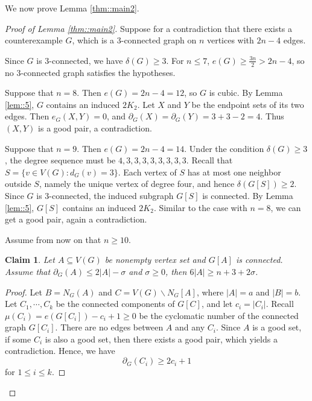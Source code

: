 \documentclass[11pt]{article}
\newtheorem{claim}{Claim}
\theoremstyle{definition}
\begin{document}
We now prove Lemma \ref{thm::main2}.





\begin{proof}[Proof of Lemma \ref{thm::main2}]
  Suppose for a contradiction that there exists a counterexample $G$, which is a $3$-connected graph on $n$ vertices with $2n-4$ edges.




  Since $G$ is $3$-connected, we have $\delta(G)\ge3$. For $n\leq7$, $e(G)\ge\frac{3n}{2}>2n-4$, so no $3$-connected graph satisfies the hypotheses.

  Suppose that $n=8$. Then $e(G)=2n-4=12$, so $G$ is cubic. By Lemma \ref{lem::5}, $G$ contains an induced $2K_2$. Let $X$ and $Y$ be the endpoint sets of its two edges. Then $e_G(X,Y)=0$, and
  $\partial_G(X)=\partial_G(Y)=3+3-2=4$.
  Thus $(X,Y)$ is a good pair, a contradiction.

  Suppose that $n=9$. Then $e(G)=2n-4=14$. Under the condition $\delta(G)\ge3$, the degree sequence must be $4,3,3,3,3,3,3,3,3$. Recall that $S=\{v\in V(G):d_G(v)=3\}$. Each vertex of $S$ has at most one neighbor outside $S$, namely the unique vertex of degree four, and hence $\delta(G[S])\ge2$. Since $G$ is 3-connected, the induced subgraph $G[S]$ is connected. By Lemma \ref{lem::5}, $G[S]$ contains an induced $2K_2$. Similar to the case with $n=8$, we can get a good pair, again a contradiction.

  Assume from now on that $n\geq 10$.

  \begin{claim}\label{claim::1}
    Let $A\subseteq V(G)$ be nonempty vertex set and $G[A]$ is connected. Assume that $\partial_G(A)\leq2|A|-\sigma$ and $\sigma\geq0$, then $6|A|\ge n+3+2\sigma$.
  \end{claim}

  \begin{proof}
    Let $B=N_G(A)$ and $C=V(G)\backslash N_G[A]$, where $|A|=a$ and $|B|=b$. Let $C_1,\cdots,C_k$ be the connected components of $G[C]$, and let $c_i=|C_i|$. Recall $\mu(C_i)=e(G[C_i])-c_i+1\geq 0$ be the cyclomatic number of the connected graph $G[C_i]$. There are no edges between $A$ and any $C_i$. Since $A$ is a good set, if some $C_i$ is also a good set, then there exists a good pair, which yields a contradiction. Hence, we have
    \begin{equation}\label{eq::5}
      \partial_G(C_i)\geq2c_i+1
    \end{equation}
    for $1\leq i\leq k$.


\end{proof}
\end{proof}
\end{document}
